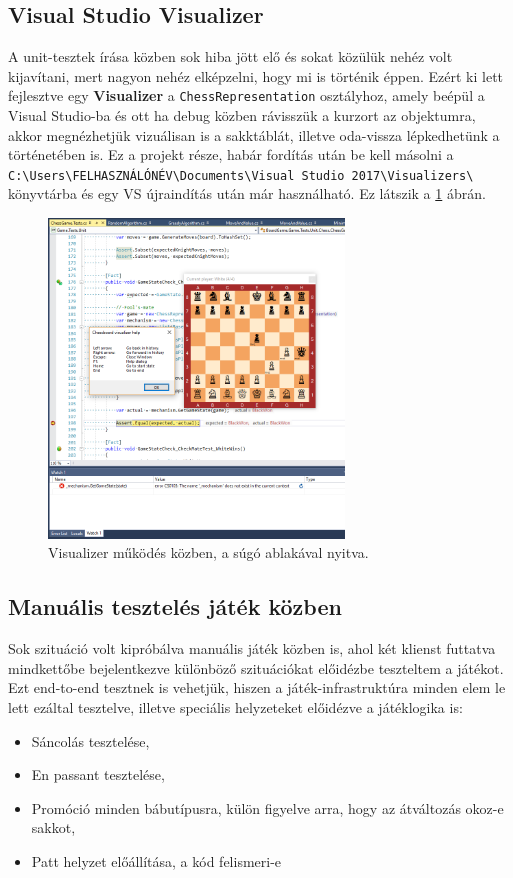 \documentclass[twoside, a4paper, 12pt]{book}
\begin{document}
\subsection{Visual Studio Visualizer}
A unit-tesztek írása közben sok hiba jött elő és sokat közülük nehéz volt kijavítani, mert nagyon nehéz elképzelni, hogy mi is történik éppen. Ezért ki lett fejlesztve egy \textbf{Visualizer} a \texttt{ChessRepresentation} osztályhoz, amely beépül a Visual Studio-ba és ott ha debug közben rávisszük a kurzort az objektumra, akkor megnézhetjük vizuálisan is a sakktáblát, illetve oda-vissza lépkedhetünk a történetében is. Ez a projekt része, habár fordítás után be kell másolni a \texttt{C:\textbackslash Users\textbackslash FELHASZNÁLÓNÉV\textbackslash Documents\textbackslash Visual Studio 2017\textbackslash Visualizers\textbackslash} könyvtárba és egy VS újraindítás után már használható. Ez látszik a \ref{fig:visualizer} ábrán.

\begin{figure}[htbp]
	\centering
	\includegraphics[width=0.7\textwidth]{img/visualizer.png}
	\caption{Visualizer működés közben, a súgó ablakával nyitva.}
	\label{fig:visualizer}
\end{figure}

\subsection{Manuális tesztelés játék közben}
Sok szituáció volt kipróbálva manuális játék közben is, ahol két klienst futtatva mindkettőbe bejelentkezve különböző szituációkat előidézbe teszteltem a játékot. Ezt end-to-end tesztnek is vehetjük, hiszen a játék-infrastruktúra minden elem le lett ezáltal tesztelve, illetve speciális helyzeteket előidézve a játéklogika is:
\begin{itemize}
	\item Sáncolás tesztelése,
	\item En passant tesztelése,
	\item Promóció minden bábutípusra, külön figyelve arra, hogy az átváltozás okoz-e sakkot,
	\item Patt helyzet előállítása, a kód felismeri-e
\end{itemize}
\end{document}
